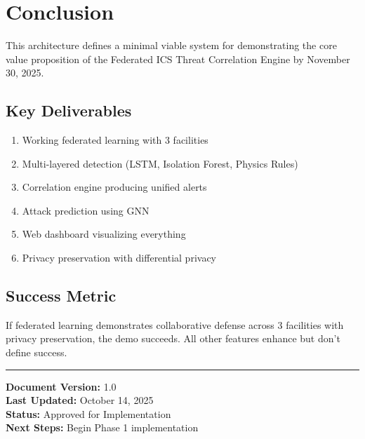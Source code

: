 \documentclass[12pt,a4paper]{article}
\begin{document}
\section{Conclusion}

This architecture defines a minimal viable system for demonstrating the core value proposition of the Federated ICS Threat Correlation Engine by November 30, 2025.

\subsection{Key Deliverables}

\begin{enumerate}[leftmargin=1cm,itemsep=0pt]
    \item Working federated learning with 3 facilities
    \item Multi-layered detection (LSTM, Isolation Forest, Physics Rules)
    \item Correlation engine producing unified alerts
    \item Attack prediction using GNN
    \item Web dashboard visualizing everything
    \item Privacy preservation with differential privacy
\end{enumerate}

\subsection{Success Metric}

If federated learning demonstrates collaborative defense across 3 facilities with privacy preservation, the demo succeeds. All other features enhance but don't define success.

\vspace{1cm}

\noindent\rule{\textwidth}{0.4pt}

\noindent\textbf{Document Version:} 1.0 \\
\textbf{Last Updated:} October 14, 2025 \\
\textbf{Status:} Approved for Implementation \\
\textbf{Next Steps:} Begin Phase 1 implementation
\end{document}
